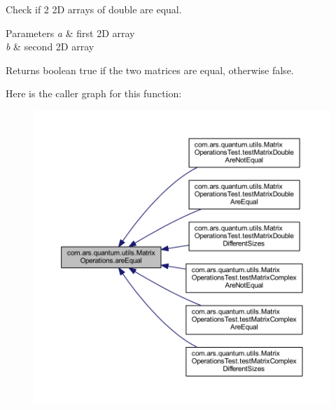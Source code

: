 Check if 2 2D arrays of double are equal.


\begin{DoxyParams}{Parameters}
{\em a} & first 2D array \\
\hline
{\em b} & second 2D array \\
\hline
\end{DoxyParams}
\begin{DoxyReturn}{Returns}
boolean true if the two matrices are equal, otherwise false. 
\end{DoxyReturn}
Here is the caller graph for this function\+:\nopagebreak
\begin{figure}[H]
\begin{center}
\leavevmode
\includegraphics[width=350pt]{classcom_1_1ars_1_1quantum_1_1utils_1_1_matrix_operations_a04088b05f027b30f91558dba4a806f80_icgraph}
\end{center}
\end{figure}
\hypertarget{classcom_1_1ars_1_1quantum_1_1utils_1_1_matrix_operations_a8b04e4621fe0c2496b5617d237d86baa}{}\label{classcom_1_1ars_1_1quantum_1_1utils_1_1_matrix_operations_a8b04e4621fe0c2496b5617d237d86baa} 

